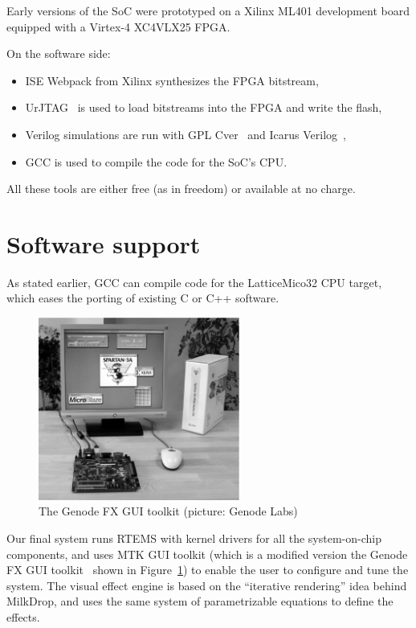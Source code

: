 \documentclass[a4paper,11pt,twocolumn]{paper}
\begin{document}
Early versions of the SoC were prototyped on a Xilinx ML401 development board equipped with a Virtex-4 XC4VLX25 FPGA.

On the software side:
\begin{itemize}
\item ISE Webpack from Xilinx synthesizes the FPGA bitstream,
\item UrJTAG~\cite{urjtag} is used to load bitstreams into the FPGA and write the flash,
\item Verilog simulations are run with GPL Cver~\cite{gplcver} and Icarus Verilog~\cite{icarus},
\item GCC is used to compile the code for the SoC's CPU.
\end{itemize}

All these tools are either free (as in freedom) or available at no charge.

\section{Software support}
As stated earlier, GCC can compile code for the LatticeMico32 CPU target, which eases the porting of existing C or C++ software.

\begin{figure}
\centering
\includegraphics[height=60mm]{genode_bw.eps}
\caption{The Genode FX GUI toolkit (picture: Genode Labs)}
\label{fig:genodefx}
\end{figure}

Our final system runs RTEMS with kernel drivers for all the system-on-chip components, and uses MTK GUI toolkit (which is a modified version the Genode FX GUI toolkit~\cite{genodefx} shown in Figure~\ref{fig:genodefx}) to enable the user to configure and tune the system. The visual effect engine is based on the ``iterative rendering'' idea behind MilkDrop, and uses the same system of parametrizable equations to define the effects.
\end{document}
